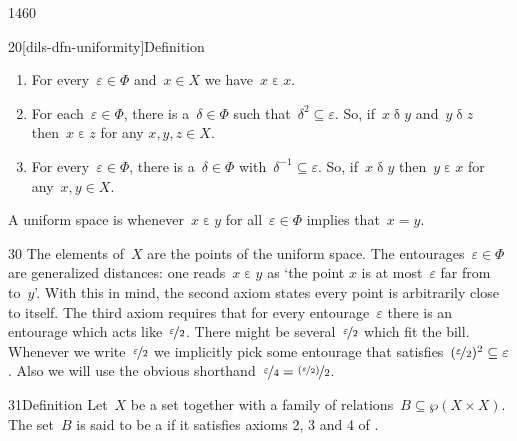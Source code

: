\begin{parsec}{1460}
\begin{point}{20}[dils-dfn-uniformity]{Definition}
\begin{enumerate}
    \item
        For every~$\varepsilon \in \Phi$
            and~$x \in X$ we have~$x \mathrel\varepsilon x$.
    \item
        For each~$\varepsilon \in \Phi$,
            there is a~$\delta \in \Phi$
            such that~$\delta^2 \subseteq \varepsilon$.
        So, if~$x \mathrel\delta y$ and~$y \mathrel\delta z$
            then~$x \mathrel\varepsilon z$ for any $x,y,z \in X$.
    \item
        For every~$\varepsilon \in \Phi$,
            there is a~$\delta \in \Phi$
                with~$\delta^{-1}\subseteq \varepsilon$.
        So, if~$x \mathrel\delta y$ then~$y \mathrel\varepsilon x$
            for any~$x,y \in X$.
    \end{enumerate}
    A uniform space is 
        whenever~$x \mathrel\varepsilon y$
            for all~$\varepsilon \in \Phi$
            implies that~$x=y$.
\begin{point}{30}%
The elements of~$X$ are the points of the uniform space.
The entourages~$\varepsilon \in \Phi$
    are generalized distances:
one reads~$x \mathrel\varepsilon y$ as
    `the point $x$ is at most~$\varepsilon$ far from to~$y$'.
With this in mind, the second axiom states every point is arbitrarily close
    to itself.
The third axiom requires that for every entourage~$\varepsilon$
    there is an entourage which acts like~$\nicefrac{\varepsilon}{2}$.
There might be several~$\nicefrac{\varepsilon}{2}$
    which fit the bill.
Whenever we write~$\nicefrac{\varepsilon}{2}$
    we implicitly pick some entourage that
    satisfies~$(\nicefrac{\varepsilon}{2})^2 \subseteq \varepsilon$.
Also we will use the obvious shorthand~$\nicefrac{\varepsilon}{4}
=   \nicefrac{(\nicefrac{\varepsilon}{2})}{2}$.
\end{point}
\end{point}
\begin{point}{31}{Definition}%
Let~$X$ be a set together with
    a family of relations~$B \subseteq \wp (X \times X)$.
The set~$B$ is said to be a 
    if it satisfies axioms 2, 3 and 4
    of .
\end{point}

\end{parsec}
